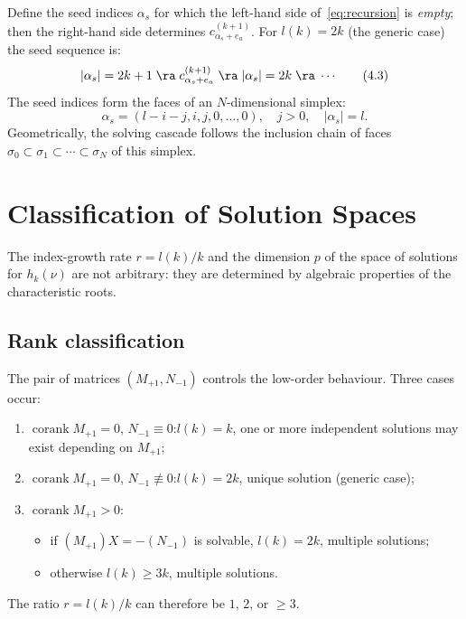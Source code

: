 \documentclass[12pt]{article}
\begin{document}
Define the seed indices $\alpha_s$ for which the left-hand side of~\eqref{eq:recursion}
is \emph{empty}; then the right-hand side determines $c^{(k+1)}_{\alpha_s+e_a}$.
For $l(k)=2k$ (the generic case) the seed sequence is:
\[
  |\alpha_s|=2k+1 \;\ra\; c^{(k+1)}_{\alpha_s+e_a}
  \;\ra\; |\alpha_s|=2k \;\ra\; \cdots
\tag{4.3}\label{eq:seed_seq}
\]
The seed indices form the faces of an $N$-dimensional simplex:
\[
  \alpha_s=(l-i-j,i,j,0,\ldots,0),\quad j>0,\quad
  |\alpha_s|=l .
\tag{4.4}\label{eq:simplex}
\]
Geometrically, the solving cascade follows the inclusion chain of faces
$\sigma_0\subset\sigma_1\subset\cdots\subset\sigma_N$ of this simplex.

\section{Classification of Solution Spaces}\label{sec:classification}

The index-growth rate $r=l(k)/k$ and the dimension $p$ of the space of solutions
for $h_k(\nu)$ are not arbitrary: they are determined by algebraic properties of
the characteristic roots.

\subsection{Rank classification}\label{ssec:rank_class}

The pair of matrices $(M_{+1},N_{-1})$ controls the low-order behaviour.
Three cases occur:
\begin{enumerate}
  \item $\operatorname{corank}M_{+1}=0$, $N_{-1}\equiv0$:\quad $l(k)=k$,
        one or more independent solutions may exist depending on $M_{+1}$;
  \item $\operatorname{corank}M_{+1}=0$, $N_{-1}\not\equiv0$:\quad $l(k)=2k$,
        unique solution (generic case);
  \item $\operatorname{corank}M_{+1}>0$:
        \begin{itemize}
          \item if $(M_{+1})X=-(N_{-1})$ is solvable, $l(k)=2k$, multiple solutions;
          \item otherwise $l(k)\ge 3k$, multiple solutions.
        \end{itemize}
\end{enumerate}
The ratio $r=l(k)/k$ can therefore be $1$, $2$, or $\ge 3$.
\end{document}
